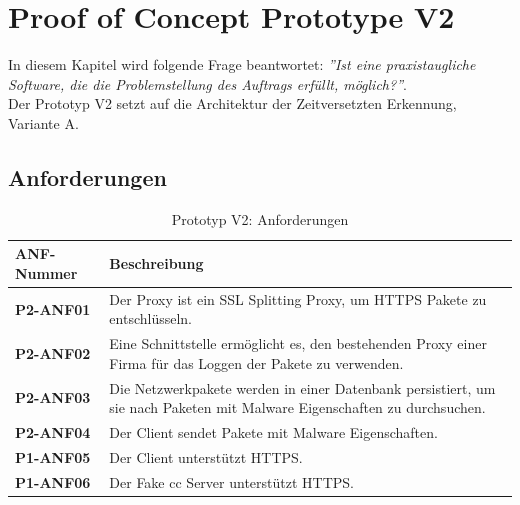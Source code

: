 \newpage
\chapter{Proof of Concept Prototype V2}
\label{poc2:chapter}
In diesem Kapitel wird folgende Frage beantwortet: \textit{''Ist eine praxistaugliche Software, die die Problemstellung des Auftrags erfüllt, möglich?''}.\\

Der Prototyp V2 setzt auf die Architektur der Zeitversetzten Erkennung, Variante A.

\begin{table}[H]
	\section{Anforderungen}
    \centering
	\begin{tabularx}{\textwidth}{| l | X |}
        \hline
        \textbf{ANF-Nummer} & \textbf{Beschreibung} \\ \hline
        \textbf{P2-ANF01} & Der Proxy ist ein SSL Splitting Proxy, um HTTPS Pakete zu entschlüsseln. \\ \hline    
		\textbf{P2-ANF02} & Eine Schnittstelle ermöglicht es, den bestehenden Proxy einer Firma für das Loggen der Pakete zu verwenden. \\ \hline
		\textbf{P2-ANF03} & Die Netzwerkpakete werden in einer Datenbank persistiert, um sie nach Paketen mit Malware Eigenschaften zu durchsuchen. \\ \hline
		\textbf{P2-ANF04} & Der Client sendet Pakete mit Malware Eigenschaften. \\ \hline 
		\textbf{P1-ANF05} & Der Client unterstützt HTTPS. \\ \hline      
        \textbf{P1-ANF06} & Der Fake \gls{cc} Server unterstützt HTTPS.  \\ \hline   
    \end{tabularx}
    \caption{Prototyp V2: Anforderungen}
\end{table}


